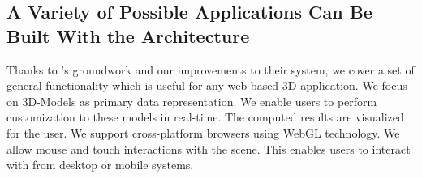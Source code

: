 \documentclass[../../ClassicThesis.tex]{subfiles}
\begin{document}
\subsection{A Variety of Possible Applications Can Be Built With the {\convertify} Architecture}
\label{sec:variety-of-applications}

Thanks to {\brickify}'s groundwork and our improvements to their
system, we cover a set of general functionality which is useful for
any web-based 3D application. We focus on 3D-Models as primary data
representation. We enable users to perform customization to these
models in real-time. The computed results are visualized for the user.
We support cross-platform browsers using WebGL technology. We allow
mouse and touch interactions with the scene. This enables users to
interact with {\convertify} from desktop or mobile systems.

\end{document}
